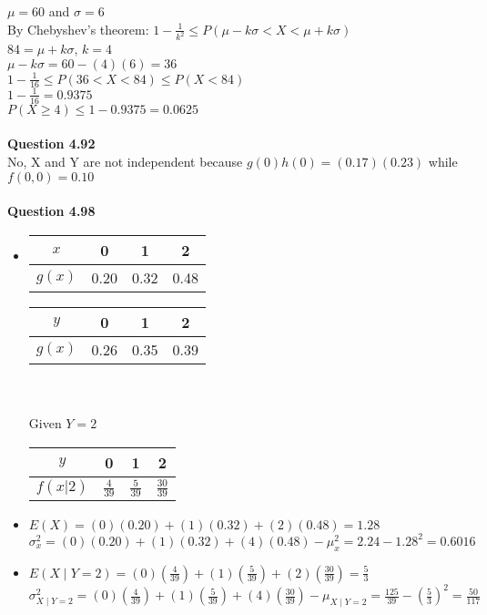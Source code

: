 \documentclass{article}
\begin{document}
        $\mu = 60$ and $\sigma = 6$\\
        By Chebyshev's theorem: $1 - \frac{1}{k^2}\leq P(\mu-k\sigma < X < \mu + k\sigma)$\\
        $84 = \mu + k\sigma$, $k = 4$\\
        $\mu-k\sigma = 60 - (4)(6) = 36$\\
        $1-\frac{1}{16}\leq P(36<X<84)\leq P(X<84)$\\
        $1-\frac{1}{16} = 0.9375$\\
        $P(X\geq 4) \leq 1 - 0.9375 = 0.0625$
        \\\\
    \textbf{Question 4.92}\\
        No, X and Y are not independent because $g(0)h(0) = (0.17)(0.23)$ while $f(0,0)=0.10$
        \\\\
    \textbf{Question 4.98}
    \begin{itemize}
        \item \begin{tabular}{c|c c c}
                  $x$ & 0 & 1 & 2\\
                  \hline
                  $g(x)$ & 0.20 & 0.32 & 0.48
              \end{tabular} \text{    }
              \begin{tabular}{c|c c c}
                $y$ & 0 & 1 & 2\\
                \hline
                $g(x)$ & 0.26 & 0.35 & 0.39
              \end{tabular}\\\\
              Given $Y=2$\\
              \begin{tabular}{c|c c c}
                $y$ & 0 & 1 & 2\\
                \hline
                $f(x|2)$ & $\frac{4}{39}$ & $\frac{5}{39}$ & $\frac{30}{39}$
              \end{tabular}
        \item $E(X) = (0)(0.20)+(1)(0.32)+(2)(0.48) = 1.28$\\
              $\sigma_x^2 = (0)(0.20) + (1)(0.32) + (4)(0.48) - \mu_x^2= 2.24 - 1.28^2 = 0.6016$
        \item $E(X\mid Y = 2) = (0)(\frac{4}{39}) + (1)(\frac{5}{39}) + (2)(\frac{30}{39}) = \frac{5}{3}$\\
              $\sigma_{X\mid Y=2}^2 = (0)(\frac{4}{39}) + (1)(\frac{5}{39}) + (4)(\frac{30}{39}) - \mu_{X\mid Y=2}= \frac{125}{39} - (\frac{5}{3})^2 = \frac{50}{117}$
    \end{itemize}
        
\end{document}
